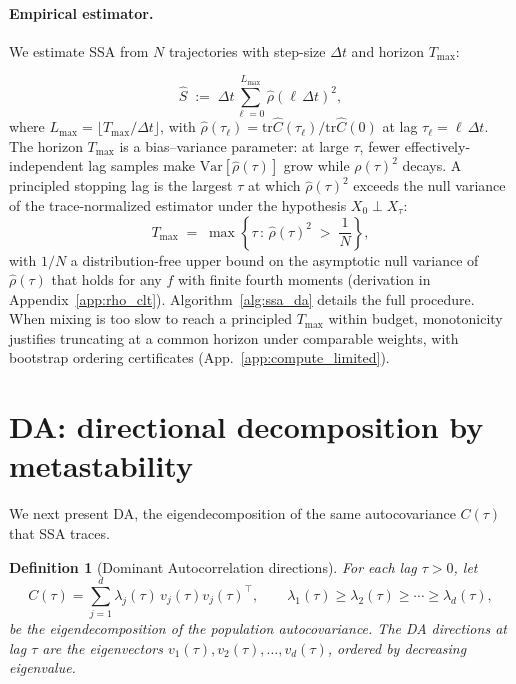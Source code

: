 \documentclass{article}
\newcommand{\Var}{\mathrm{Var}}
\newcommand{\tr}{\mathrm{tr}}
\newtheorem{definition}{Definition}
\begin{document}
\paragraph{Empirical estimator.}
We estimate SSA from $N$ trajectories with step-size $\Delta t$ and horizon $T_{\max}$:

\begin{equation}
\widehat S \;:=\; \Delta t \sum_{\ell = 0}^{L_{\max}} \hat\rho(\ell\,\Delta t)^2,
\label{eq:ssa_estimator}
\end{equation}
where $L_{\max} = \lfloor T_{\max}/\Delta t \rfloor$,
with $\hat\rho(\tau_\ell) = \tr\hat C(\tau_\ell)/\tr\hat C(0)$ at lag $\tau_\ell = \ell\,\Delta t$. The horizon $T_{\max}$ is a bias--variance parameter: at large $\tau$, fewer effectively-independent lag samples make $\Var[\hat\rho(\tau)]$ grow while $\rho(\tau)^2$ decays. A principled stopping lag is the largest $\tau$ at which $\hat\rho(\tau)^2$ exceeds the null variance of the trace-normalized estimator under the hypothesis $X_0 \perp X_\tau$:
\begin{equation}
T_{\max} \;=\; \max\!\left\{\tau \,:\, \hat\rho(\tau)^2 \;>\; \frac{1}{N}\right\},
\label{eq:tmax_stopping}
\end{equation}
with $1/N$ a distribution-free upper bound on the asymptotic null variance of $\hat\rho(\tau)$ that holds for any $f$ with finite fourth moments (derivation in Appendix~\ref{app:rho_clt}). Algorithm~\ref{alg:ssa_da} details the full procedure. When mixing is too slow to reach a principled $T_{\max}$ within budget, monotonicity justifies truncating at a common horizon under comparable weights, with bootstrap ordering certificates (App.~\ref{app:compute_limited}).

\section{DA: directional decomposition by metastability}
\label{sec:da}

We next present DA, the eigendecomposition of the same autocovariance $C(\tau)$ that SSA traces.

\begin{definition}[Dominant Autocorrelation directions]
\label{def:da}
For each lag $\tau > 0$, let
\[
C(\tau) = \sum_{j=1}^d \lambda_j(\tau)\, v_j(\tau) v_j(\tau)^\top,
\qquad
\lambda_1(\tau) \geq \lambda_2(\tau) \geq \cdots \geq \lambda_d(\tau),
\]
be the eigendecomposition of the population autocovariance. The DA
directions at lag $\tau$ are the eigenvectors
$v_1(\tau), v_2(\tau), \ldots, v_d(\tau)$, ordered by decreasing
eigenvalue. 
\end{definition}
\end{document}
